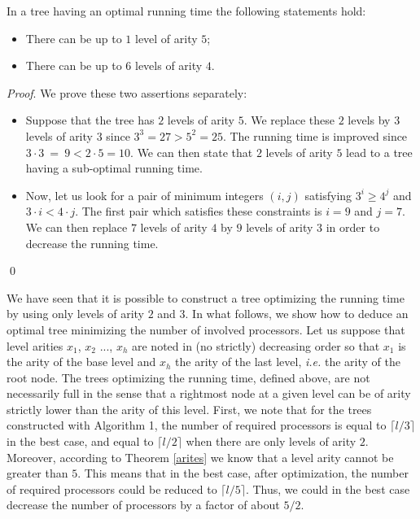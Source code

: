 \documentclass{llncs}
\renewenvironment{proof}{\paragraph{Proof} }{\hfill\qed}
\renewcommand{\paragraph}[1]{\noindent\textit{#1}.}
\begin{document}
\begin{lemma}\label{numb_ar_4_and_5}
In a tree having an optimal running time the following statements hold:
\begin{itemize}
 \item There can be up to $1$ level of arity $5$; 
 \item There can be up to $6$ levels of arity $4$.
\end{itemize}
\end{lemma}

\begin{sloppypar}
\begin{proof}
We prove these two assertions separately:
\begin{itemize}
 \item Suppose that the tree has $2$ levels of arity $5$. We 
replace these $2$ levels by $3$ levels of arity $3$ since $3^3=27>5^2=25$.
The running time is improved since $3\cdot3~=~9<2\cdot5=10$. 
We can then state that $2$ levels of arity $5$ lead to a tree having a sub-optimal running time. 
 \item Now, let us look for a pair of minimum integers $(i,j)$ satisfying $3^i \geq 4^j$ and $3\cdot i<4\cdot j$. 
The first pair which satisfies these constraints is $i=9$ and $j=7$. We can then replace
$7$ levels of arity $4$ by $9$ levels of arity $3$ in order to decrease the running time. 
\end{itemize}
\end{proof}
\end{sloppypar}


\begin{sloppypar}
We have seen that it is possible to construct a tree optimizing the running time by using only levels of arity $2$ and $3$.
In what follows, we 
show how 
to deduce an optimal tree minimizing the number of involved processors.
Let us suppose that level arities $x_1$, $x_2$ ..., $x_h$ are noted in (no strictly) decreasing order so that $x_1$ 
is the arity of the base level and $x_h$ the arity of the last level, 
\textit{i.e.} the arity of the root node. 
The trees optimizing the running time, defined above, are not necessarily full in the sense that a rightmost node at a given level can be of arity 
strictly lower than the arity of this level. First, we note that for the trees constructed with Algorithm 1, the number of required processors
is equal to $\lceil l/3 \rceil$ in the best case, and equal to $\lceil l/2 \rceil$ when there are only levels of arity $2$. Moreover, 
according to Theorem \ref{arites} 
we know that a level arity cannot be greater than $5$. This means that in the best case, after optimization, the number of required processors 
could be reduced to $\lceil l/5 \rceil$. Thus, we could in the best case decrease the number of processors 
by a factor of about $5/2$.
\end{sloppypar}
\end{document}
